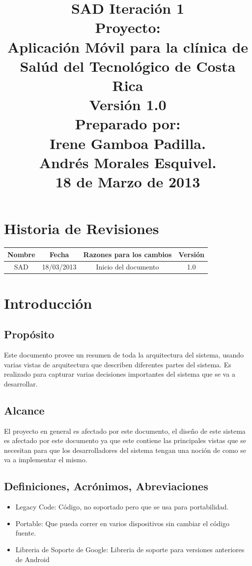 \documentclass[12pt]{article}
\title{\begin{flushright}\textbf{SAD Iteraci\'on 1} \\[0.7in] 
		Proyecto: \\[0.2in]
		\textbf{Aplicaci\'on M\'ovil para la cl\'inica de Sal\'ud del Tecnol\'ogico de Costa Rica}\\[0.7in]
		Versi\'on 1.0 \\[0.7in]
		Preparado por: \\[0.2in]
		\textbf{Irene Gamboa Padilla.\\
		Andr\'es Morales Esquivel.} \\[0.7in]
		18 de Marzo de 2013
		\end{flushright}}
\author{}
\date{}
\begin{document}
\maketitle
\newpage
\renewcommand{\contentsname}{Tabla de Contenido}
{\footnotesize
	\tableofcontents
}
\section{Historia de Revisiones}

\begin{center}
	\begin{tabular}{|c|c|c|c|}
	\hline
		\textbf{Nombre} & \textbf{Fecha} & \textbf{Razones para los cambios} & \textbf{Versi\'on}\\
	\hline
		SAD & 18/03/2013 & Inicio del documento & 1.0\\
	\hline
	\end{tabular}
\end{center}

\newpage
\section{Introducci\'on}

\subsection{Prop\'osito}
Este documento provee un resumen de toda la arquitectura del sistema, usando varias vistas de arquitectura que describen diferentes partes del sistema. Es realizado para capturar varias decisiones importantes del sistema que se va a desarrollar.

\subsection{Alcance}
El proyecto en general es afectado por este documento, el dise\~no de este sistema es afectado por este documento ya que este contiene las principales vistas que se necesitan para que los desarrolladores del sistema tengan una noci\'on de como se va a implementar el mismo.

\subsection{Definiciones, Acr\'onimos, Abreviaciones}
\begin{itemize}
	\item{Legacy Code: C\'odigo, no soportado pero que se usa para portabilidad.}
	\item{Portable: Que pueda correr en varios dispositivos sin cambiar el c\'odigo fuente.}
	\item{Libreria de Soporte de Google: Libreria de soporte para versiones anteriores de Android}
\end{itemize}
\end{document}
